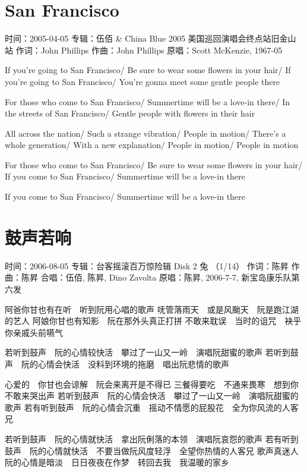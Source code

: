 \documentclass[UTF8,a4paper,oneside,twocolumn,12pt]{ctexbook}
\newcommand{\infopair}[2]{\textbullet #1：#2}
\newcommand{\zc}[1][伍佰]{\infopair{作词}{#1}}
\newcommand{\zq}[1][伍佰]{\infopair{作曲}{#1}}
\newcommand{\zj}[1]{\infopair{专辑}{#1}}
\newcommand{\yc}[1]{\infopair{原唱}{#1}}
\newcommand{\sj}[1]{\infopair{时间}{#1}}
\newenvironment{info}{\begin{flushleft}\kaishu
	}
	{\end{flushleft}\normalsize\yahei\par}
\newenvironment{lyric}{
	}
{}
\begin{document}
\section{San Francisco}%
\begin{info}
	\sj{2005-04-05}%
	\zj{伍佰 \& China Blue 2005 美国巡回演唱会终点站旧金山站}
	\zc[John Phillips]
	\zq[John Phillips]
	\yc{Scott McKenzie, 1967-05}
\end{info}
\begin{lyric}
	If you're going to San Francisco/
	Be sure to wear some flowers in your hair/
	If you're going to San Francisco/
	You're gonna meet some gentle people there

	For those who come to San Francisco/
	Summertime will be a love-in there/
	In the streets of San Francisco/
	Gentle people with flowers in their hair

	All across the nation/
	Such a strange vibration/
	People in motion/
	There's a whole generation/
	With a new explanation/
	People in motion/
	People in motion

	For those who come to San Francisco/
	Be sure to wear some flowers in your hair/
	If you come to San Francisco/
	Summertime will be a love-in there

	If you come to San Francisco/
	Summertime will be a love-in there
\end{lyric}

\section{鼓声若响}
\begin{info}
	\sj{2006-08-05}
	\zj{台客摇滚百万惊险辑 Disk 2 兔 （1/14）}
	\zc[陈昇]
	\zq[陈昇]
	\infopair{合唱}{伍佰, 陈昇, Dino Zavolta}
	\yc{陈昇, 2006-7-7, 新宝岛康乐队第六发}
\end{info}
\begin{lyric}
	阿爸你甘也有在听　听到阮用心唱的歌声
	呒管落雨天　或是风颱天　阮是跑江湖的艺人
	阿娘你甘也有知影　阮在那外头真正打拼
	不敢来耽误　当时的诅咒　袂乎你亲戚头前嚥气

	若听到鼓声　阮的心情较快活　攀过了一山又一岭　演唱阮甜蜜的歌声
	若听到鼓声　阮的心情会快活　没料到环境的拖磨　唱出阮悲情的歌声

	心爱的　你甘也会谅解　阮会来离开是不得已
	三餐得要吃　不通来畏寒　想到你不敢来哭出声
	若听到鼓声　阮的心情会快活　攀过了一山又一岭　演唱阮甜蜜的歌声
	若有听到鼓声　阮的心情会沉重　摇动不情愿的屁股花　全为你风流的人客兄

	若听到鼓声　阮的心情就快活　拿出阮俐落的本领　演唱阮哀怨的歌声
	若有听到鼓声　阮的心情就快活　不要当做阮风度轻浮　全望你热情的人客兄
	歌声真迷人　阮的心情是暗淡　日日夜夜在作梦　转回去我　我温暖的家乡
\end{lyric}
\end{document}

